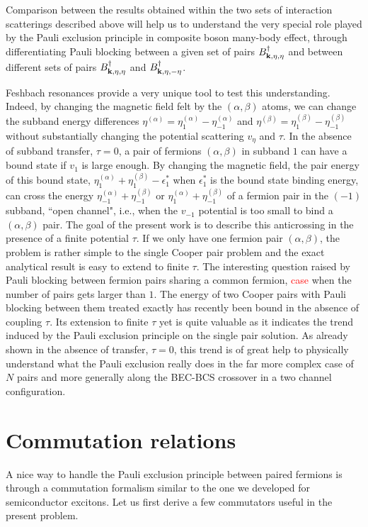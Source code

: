 \documentclass[11pt]{article} %
\newcommand{\ns}[1]{\textcolor{red}{#1}}
\begin{document}
Comparison between the results obtained within the two sets of interaction scatterings described above will help us to understand the very special role played by the Pauli exclusion principle in composite boson many-body effect, through differentiating Pauli blocking between a given set of pairs $B^{\dagger}_{\mathbf{k},\eta,\eta}$ and between different sets of pairs $B^{\dagger}_{\mathbf{k},\eta,\eta}$ and $B^{\dagger}_{\mathbf{k},\eta,-\eta}$.

Feshbach resonances provide a very unique tool to test this understanding. Indeed, by changing the magnetic field felt by the $(\alpha,\beta)$ atoms, we can change the subband energy differences $\eta^{(\alpha)}=\eta^{(\alpha)}_1-\eta^{(\alpha)}_{-1}$ and  $\eta^{(\beta)}=\eta^{(\beta)}_1-\eta^{(\beta)}_{-1}$ without substantially changing the potential scattering $v_{\eta}$ and $\tau$.  In the absence of subband {transfer}, $\tau=0$, a pair of fermions $(\alpha,\beta)$ in subband $1$ can have a bound state if $v_1$ is large enough.  By changing the magnetic field, the pair energy of this bound state, $\eta^{(\alpha)}_1+\eta^{(\beta)}_{1}-\epsilon_1^*$ when $\epsilon_1^*$ is the bound state binding energy, can cross the energy  $\eta^{(\alpha)}_{-1}+\eta^{(\beta)}_{-1}$ or  $\eta^{(\alpha)}_{1}+\eta^{(\beta)}_{-1}$ of a fermion pair in the $(-1)$ subband, ``open channel", i.e., when the $v_{-1}$ potential is too small to bind a  $(\alpha,\beta)$ pair. The goal of the present work is to describe this anticrossing in the presence of a finite potential $\tau$.  If we only have one fermion pair  $(\alpha,\beta)$, the problem is  rather simple to the single Cooper pair problem and the exact analytical result is easy to extend to finite $\tau$.  The interesting question raised by Pauli blocking between fermion pairs sharing a common fermion, \ns{case} when the number of pairs gets larger than $1$.  The energy of two Cooper pairs with Pauli blocking between them treated exactly has recently been bound in the absence of coupling $\tau$\cite{combescotBCS}.  Its extension to finite $\tau$ {yet} is quite valuable as it indicates the trend induced by the Pauli exclusion principle on the single pair solution.  As already shown in the absence of transfer, $\tau=0$, this trend is of great help to physically understand what the Pauli exclusion really does in the far more complex case of $N$ pairs and more generally along the BEC-BCS crossover in a two channel configuration. 

\section{Commutation relations\label{sec:comm}}
A nice way to handle the Pauli exclusion principle between paired fermions is through a commutation formalism similar to the one we developed for semiconductor excitons\cite{CobosonPhysicsReports}.  Let us first derive a few commutators useful in the present problem. 
\end{document}
